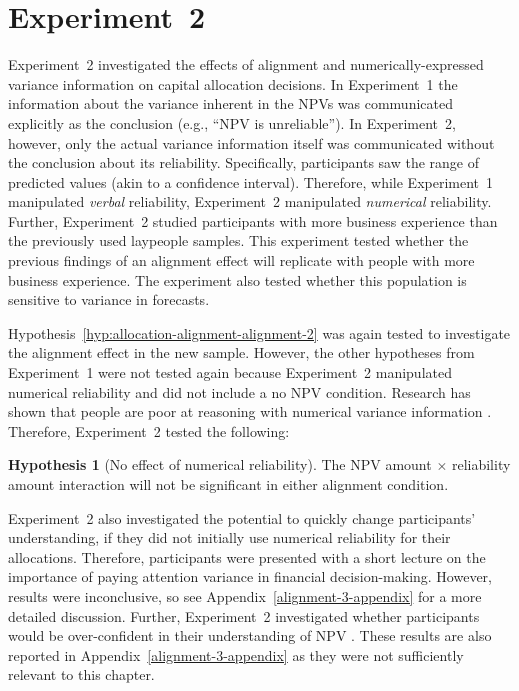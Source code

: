 \documentclass[a4paper, nobind, dvipsnames]{templates/ociamthesis}
\theoremstyle{definition}
\theoremstyle{definition}
\theoremstyle{definition}
\theoremstyle{definition}
\newtheorem{hypothesis}{Hypothesis}[chapter]
\theoremstyle{remark}
\begin{document}
\hypertarget{alignment-3}{%
\section{Experiment~2}\label{alignment-3}}

Experiment~2 investigated the effects of alignment and numerically-expressed
variance information on capital allocation decisions. In Experiment~1 the
information about the variance inherent in the NPVs was communicated explicitly
as the conclusion (e.g., ``NPV is unreliable''). In Experiment~2, however, only
the actual variance information itself was communicated without the conclusion
about its reliability. Specifically, participants saw the range of predicted
values (akin to a confidence interval). Therefore, while Experiment~1
manipulated \emph{verbal} reliability, Experiment~2 manipulated \emph{numerical}
reliability. Further, Experiment~2 studied participants with more business
experience than the previously used laypeople samples. This experiment tested
whether the previous findings of an alignment effect will replicate with people
with more business experience. The experiment also tested whether this
population is sensitive to variance in forecasts.

Hypothesis~\ref{hyp:allocation-alignment-alignment-2} was again tested to
investigate the alignment effect in the new sample. However, the other
hypotheses from Experiment~1 were not tested again because Experiment~2
manipulated numerical reliability and did not include a no NPV condition.
Research has shown that people are poor at reasoning with numerical variance
information \autocite{galesic2010,konold1993,vivalt2021,batteux2020}. Therefore,
Experiment~2 tested the following:

\begin{hypothesis}[No effect of numerical reliability]
\protect\hypertarget{hyp:allocation-npv-reliability-alignment-3}{}{\label{hyp:allocation-npv-reliability-alignment-3} {} }The NPV amount \(\times\) reliability amount interaction will not be significant
in either alignment condition.
\end{hypothesis}

Experiment~2 also investigated the potential to quickly change participants'
understanding, if they did not initially use numerical reliability for their
allocations. Therefore, participants were presented with a short lecture on the
importance of paying attention variance in financial decision-making. However,
results were inconclusive, so see Appendix~\ref{alignment-3-appendix} for a
more detailed discussion. Further, Experiment~2 investigated whether
participants would be over-confident in their understanding of NPV \autocite[as in][]{long2018}. These results are also reported in
Appendix~\ref{alignment-3-appendix} as they were not sufficiently relevant to
this chapter.
\end{document}
